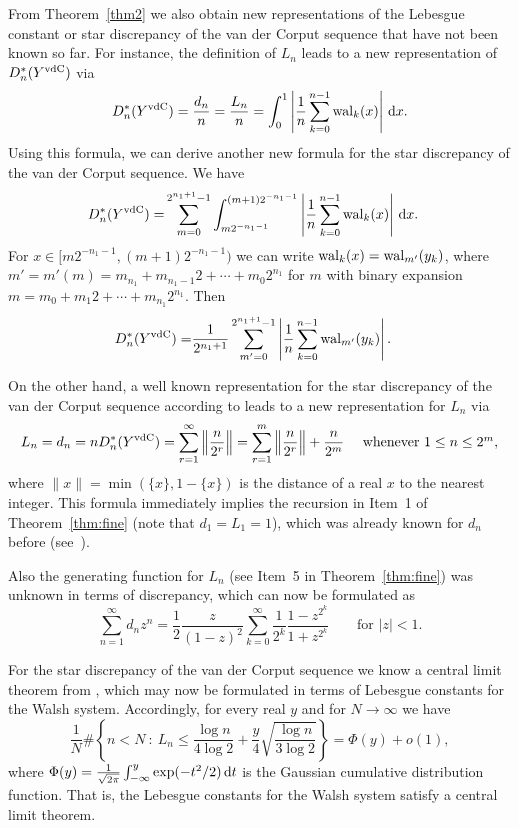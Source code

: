\documentclass[12pt]{article}
\newcommand{\wal}{{\rm wal}}
\newcommand{\rd}{\,{\rm d}}
\begin{document}
From Theorem~\ref{thm2} we also obtain new representations of the Lebesgue constant or star discrepancy of the van der Corput sequence that have not been known so far. For instance, the definition of $L_n$ leads to a new representation of $D_n^{\ast}(Y^{{\rm vdC}})$ via 
\begin{equation*}
D_n^{\ast}(Y^{{\rm vdC}})=\frac{d_n}{n}=\frac{L_n}{n}=\int_0^1 \left|\frac{1}{n}\sum_{k=0}^{n-1} \wal_k(x)\right| \rd x.
\end{equation*}
Using this formula, we can derive another new formula for the star discrepancy of the van der Corput sequence. We have
\begin{align*}
D_n^{\ast}(Y^{{\rm vdC}}) = & \sum_{m=0}^{2^{n_1+1}-1} \int_{m 2^{-n_1-1}}^{(m+1) 2^{-n_1-1}} \left|\frac{1}{n} \sum_{k=0}^{n-1} \wal_k(x) \right| \rd x.
\end{align*}
For $x \in [m 2^{-n_1-1}, (m+1) 2^{-n_1-1})$ we can write $\wal_k(x) = \wal_{m'}(y_k)$, where $m'=m'(m)=m_{n_1}+m_{n_1-1} 2 +\cdots+m_0 2^{n_1}$ for $m$ with binary expansion $m=m_0+m_1 2+\cdots+m_{n_1} 2^{n_1}$. Then
\begin{align*}
D^\ast_n(Y^{{\rm vdC}}) = & \frac{1}{2^{n_1+1}} \sum_{m'=0}^{2^{n_1+1}-1}  \left| \frac{1}{n} \sum_{k=0}^{n-1} \wal_{m'}(y_k) \right|.
\end{align*}

On the other hand, a well known representation for the star discrepancy of the van der Corput sequence according to \cite[Th\'eor\`eme~1]{befa77} leads to a new representation for $L_n$ via 
$$L_n=d_n=n D_n^{\ast}(Y^{{\rm vdC}}) =\sum_{r=1}^{\infty} \left\|\frac{n}{2^r}\right\|  = \sum_{r=1}^m
\left\|\frac{n}{2^r}\right\|+\frac{n}{2^m}\
 \ \ \mbox{ whenever $1 \le n \le 2^m$},$$
where $\|x\|=\min(\{x\},1-\{x\})$ is the distance of a real $x$ to the nearest integer. This formula immediately implies the recursion in Item~1 of Theorem~\ref{thm:fine} (note that $d_1=L_1=1$), which was already known for $d_n$ before (see~\cite[p.~13-07]{befa77}). 

Also the generating function for $L_n$ (see Item~5 in Theorem~\ref{thm:fine}) was unknown in terms of discrepancy, which can now be formulated as  $$\sum_{n=1}^{\infty} d_n z^n =\frac{1}{2} \frac{z}{(1-z)^2} \sum_{k=0}^{\infty}\frac{1}{2^k} \frac{1-z^{2^k}}{1+z^{2^k}} \qquad \mbox{for $|z|<1$.}$$

For the star discrepancy of the van der Corput sequence we know a central limit theorem from \cite{dlp04}, which may now be formulated in terms of Lebesgue constants for the Walsh system. Accordingly, for every real $y$ and for $N \rightarrow \infty$ we have
$$\frac{1}{N} \# \left\{ n < N \ : \  L_n \le \frac{\log n}{4 \log 2} + \frac{y}{4} \sqrt{
\frac{\log n}{3 \log 2}} \right\} = \Phi(y)+ o(1),$$ where 
$\Phi(y) = \frac1{\sqrt{2\pi}} \int_{-\infty}^y \exp(-t^2/2) \rd t $ is the Gaussian cumulative distribution function. 
That is, the Lebesgue constants for the Walsh system satisfy a central limit theorem.
\end{document}
